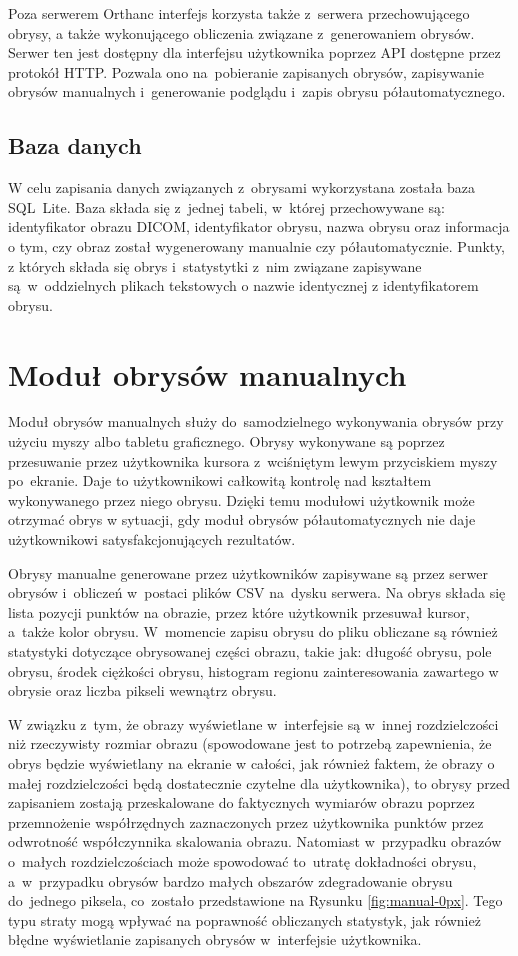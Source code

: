 \documentclass[a4paper,11pt,twoside,openright]{report}
\theoremstyle{definition}
\begin{document}
Poza serwerem Orthanc interfejs korzysta także z~serwera przechowującego obrysy,
a także wykonującego obliczenia związane z~generowaniem obrysów. Serwer ten jest
dostępny dla interfejsu użytkownika poprzez API dostępne przez protokół HTTP.
Pozwala ono na~pobieranie zapisanych obrysów, zapisywanie obrysów manualnych
i~generowanie podglądu i~zapis obrysu półautomatycznego.

\subsection {Baza danych}

W celu zapisania danych związanych z~obrysami wykorzystana została baza SQL~Lite.
Baza składa się z~jednej tabeli, w~której przechowywane są: identyfikator obrazu DICOM,
identyfikator obrysu, nazwa obrysu oraz informacja o tym, czy obraz został wygenerowany
manualnie czy półautomatycznie. Punkty, z których składa się obrys i~statystytki
z~nim związane zapisywane są~w~oddzielnych
plikach tekstowych o nazwie identycznej z identyfikatorem obrysu.

\section {Moduł obrysów manualnych}

Moduł obrysów manualnych służy do~samodzielnego wykonywania obrysów przy użyciu myszy albo tabletu
graficznego. Obrysy wykonywane są poprzez przesuwanie przez użytkownika kursora
z~wciśniętym lewym przyciskiem myszy po~ekranie. Daje to użytkownikowi całkowitą
kontrolę nad kształtem wykonywanego przez niego obrysu. Dzięki temu modułowi
użytkownik może otrzymać obrys w sytuacji,
gdy moduł obrysów półautomatycznych nie daje użytkownikowi satysfakcjonujących rezultatów.

Obrysy manualne generowane przez użytkowników zapisywane są przez serwer obrysów
i~obliczeń w~postaci plików CSV na~dysku serwera. Na obrys składa się lista
pozycji punktów na obrazie, przez które użytkownik przesuwał kursor, a~także kolor obrysu.
W~momencie zapisu obrysu do pliku obliczane są
również statystyki dotyczące obrysowanej części obrazu, takie jak: długość obrysu,
pole obrysu, środek ciężkości obrysu, histogram regionu zainteresowania zawartego w obrysie oraz
liczba pikseli wewnątrz obrysu.

W związku z~tym, że obrazy wyświetlane w~interfejsie są w~innej rozdzielczości
niż rzeczywisty rozmiar obrazu (spowodowane jest to potrzebą zapewnienia, że obrys
będzie wyświetlany na ekranie w całości, jak również faktem, że obrazy o małej rozdzielczości
będą dostatecznie czytelne dla użytkownika), to obrysy przed zapisaniem zostają przeskalowane do
faktycznych wymiarów obrazu poprzez przemnożenie współrzędnych zaznaczonych przez
użytkownika punktów przez odwrotność współczynnika skalowania obrazu.
Natomiast w~przypadku obrazów o~małych rozdzielczościach może
spowodować to~utratę dokładności obrysu, a~w~przypadku obrysów bardzo małych
obszarów zdegradowanie obrysu do~jednego piksela, co~zostało przedstawione na Rysunku
\ref{fig:manual-0px}. Tego typu straty mogą wpływać
na poprawność obliczanych statystyk, jak również błędne wyświetlanie zapisanych
obrysów w~interfejsie użytkownika.
\end{document}
